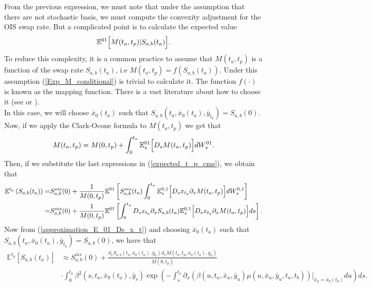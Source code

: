 \documentclass[a4paper,10pt]{article}
\newcommand{\1}{\mathbf{1}}
\begin{document}
From the previous expression, we must note that under the assumption that there are not stochastic basis, we must compute the convexity adjustment for the OIS swap rate. But a complicated point is to calculate the expected value 
\begin{equation}\label{Exp_M_conditional}
\mathbb{E}^{01}\Bigl[ M(t_a,t_p)|S_{a,b}(t_a)\Bigr].
\end{equation}
To reduce this complexity, it is a common practice to assume that $M(t_a,t_p)$ is a function of the swap rate $S_{a,b}(t_a)$, i.e   $M(t_a,t_p)=f(S_{a,b}(t_a))$. Under this assumption (\ref{Exp_M_conditional}) is trivial to calculate it. The function $f(\cdot)$ is known as the mapping function. There is a vast literature about how to choose it (see \cite{AndreasenPiterbargIII} or \cite{Hagan20}). \\ 
In this case, we will choose $\bar{x}_0(t_a)$ such that $S_{a,b}(t_a,\bar{x}_0(t_a),\bar{y}_{t_a})=S_{a,b}(0)$. Now, if we apply the Clark-Ocone formula to $M(t_a,t_p)$ we get that
\begin{equation} \label{clark_ocone_swap_m}
M(t_a,t_p) = M(0,t_p)+ \int_{0}^{t_a} \mathbb{E}_s^{01}\Bigl[D_s M(t_a,t_p)\Bigr] dW^{01}_s.
\end{equation}
Then, if we substitute the last expressions in (\ref{expected_t_p_cms}), we obtain that
\begin{align}\label{cms_first_order_convexity_prev}
\mathbb{E}^{t_p}\left(S_{a,b}(t_a)\right) =& S^{ois}_{a,b}(0) + \frac{1}{M(0,t_p)} \mathbb{E}^{01}\left[ S^{ois}_{a,b}(t_a) \int_{0}^{t_a} \mathbb{E}^{0,1}_s\Bigl[D_s x_{t_a}\partial_x M(t_a,t_p)  \Bigr] dW^{0,1}_s   \right] \nonumber \\
=&  S^{ois}_{a,b}(0) + \frac{1}{M(0,t_p)} \mathbb{E}^{01}\left[\int_{0}^{t_a} D_s x_{t_a} \partial_x S_{a,b}(t_a) \mathbb{E}^{0,1}_s\Bigl[D_s x_{t_a}\partial_x M(t_a,t_p)  \Bigr] ds   \right].
\end{align}
Now from (\ref{approximation_E_01_Ds_x_t}) and choosing $\bar{x}_0(t_a)$ such that $S_{a,b}(t_a,\bar{x}_0(t_a),\bar{y}_{t_a})=S_{a,b}(0)$, we have that
\begin{align}
\mathbb{E}^{t_p}\left[S_{a,b}(t_a)\right] &\approx  S^{ois}_{a,b}(0) + \frac{\partial_x S_{a,b}(t_a,\bar{x}_0(t_a), \bar{y}_0) \partial_x M(t_a,t_p,\bar{x}_0(t_a), \bar{y}_0)} {M(0,t_p)}\nonumber \\
&\cdot \int_{0}^{t_a}  \beta^2(s,t_a,\bar{x}_0(t_a),\bar{y}_s)\exp\left(-\int_{s}^{t_a}\partial_x (\beta(u,t_a,\bar{x}_u,\bar{y}_u) \mu(u,\bar{x}_u, \bar{y}_u,t_a,t_b))|_{\bar{x}_u=\bar{x}_{0}(t_a)}  du \right)ds.
\end{align}





%
\end{document}
